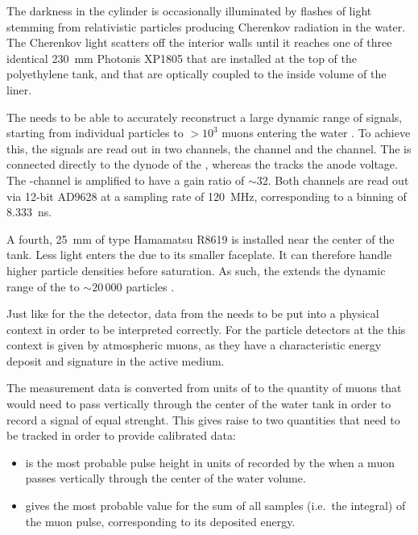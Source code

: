 The darkness in the cylinder is occasionally illuminated by flashes of light 
stemming from relativistic particles producing Cherenkov radiation in the 
water. The Cherenkov light scatters off the interior walls until it reaches 
one of three identical \SI{230}{\milli\meter} Photonis XP1805 \LPMTs 
\cite{tripathiSystematicStudyLarge2003} that are installed at the top of the 
polyethylene tank, and that are optically coupled to the inside volume of the 
liner.

The \WCD needs to be able to accurately reconstruct a large dynamic range of
signals, starting from individual particles to $>10^3$ muons entering the water
\cite{abrahamTriggerApertureSurface2010}. To achieve this, the \LPMT signals 
are read out in two channels, the \HG channel and the \LG channel. The \LG 
is connected directly to the dynode of the \PMTs, whereas the \HG tracks the 
anode voltage. The \HG-channel is amplified to have a gain ratio of $\sim32$. 
Both channels are read out via 12-bit AD9628 \FADCs 
\cite{analogdevicesinc.AD9628DatasheetProduct2015} at a sampling rate of 
\SI{120}{\mega\hertz}, corresponding to a binning of \SI{8.333}{\nano\second}.

A fourth, \SI{25}{\milli\meter} \SPMT of type Hamamatsu R8619 
\cite{hamamatsuphotonicsPhotomultiplierTubeR8619} is installed near the center
of the tank. Less light enters the \SPMT due to its smaller faceplate. It can 
therefore handle higher particle densities before saturation. As such, the 
\SPMT extends the dynamic range of the \WCD to $\sim20\,000$ particles 
\cite{collaborationPierreAugerObservatory2016}.

Just like for the \FD the detector, data from the \WCD needs to be put into 
a physical context in order to be interpreted correctly. For the particle 
detectors at the \PAO this context is given by atmospheric muons, as they have 
a characteristic energy deposit and signature in the active medium. 

The \WCD  measurement data is converted from units of \ADC to the quantity of 
muons that would need to pass vertically through the center of the water tank 
in order to record a signal of equal strenght. This gives raise to two 
quantities that need to be tracked in order to provide calibrated data:

\begin{itemize}
	\item \Ivem is the most probable pulse height in units of \ADC 
	recorded by the \WCD \PMTs when a muon passes vertically through the 
	center of the water volume.
	\item \Qvem gives the most probable value for the sum of all \ADC 
	samples (i.e.\ the integral) of the muon pulse, corresponding to its 
	deposited energy.
\end{itemize}

